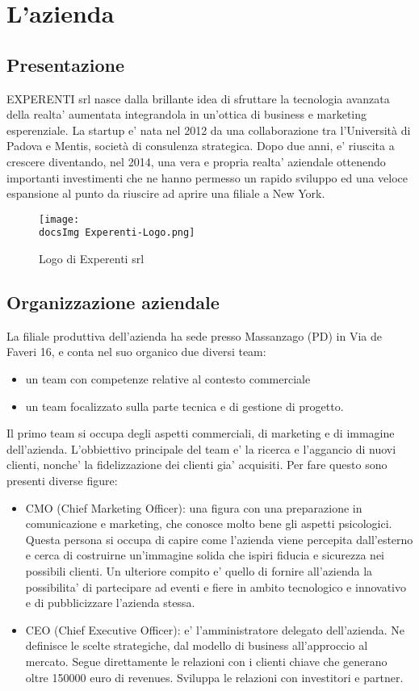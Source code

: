 \section{L'azienda}
\subsection{Presentazione}
EXPERENTI srl nasce dalla brillante idea di sfruttare la tecnologia avanzata della realta' aumentata integrandola in un'ottica di business e marketing esperenziale.
La startup e' nata nel 2012 da una collaborazione tra l’Università di Padova e Mentis, società di consulenza strategica. Dopo due anni, e' riuscita a crescere diventando, nel 2014, una vera e propria realta' aziendale ottenendo importanti investimenti che ne hanno permesso un rapido sviluppo ed una veloce espansione al punto da riuscire ad aprire una filiale a New York.

\begin{figure}[H]
	\centering
	\texttt{[image: \\docsImg Experenti-Logo.png]}
	\caption{Logo di Experenti srl}
	\label{fig:Logo di Experenti srl}
\end{figure}

\subsection{Organizzazione aziendale}
La filiale produttiva dell’azienda ha sede presso Massanzago (PD) in Via de Faveri 16, e conta nel suo organico due diversi team: 
\begin{itemize}
\item un team con competenze relative al contesto commerciale
\item un team focalizzato sulla parte tecnica e di gestione di progetto.
\end{itemize}

Il primo team si occupa degli aspetti commerciali, di marketing e di immagine dell'azienda. L'obbiettivo principale del team e' la ricerca e l'aggancio di nuovi clienti, nonche' la fidelizzazione dei clienti gia' acquisiti. Per fare questo sono presenti diverse figure:
\begin{itemize}
	\item CMO (Chief Marketing Officer): una figura con una preparazione in comunicazione e marketing, che conosce molto bene gli aspetti psicologici. Questa persona si occupa di capire come l'azienda viene percepita dall'esterno e cerca di costruirne un'immagine solida che ispiri fiducia e sicurezza nei possibili clienti. Un ulteriore compito e' quello di fornire all'azienda la possibilita' di partecipare ad eventi e fiere in ambito tecnologico e innovativo e di pubblicizzare l'azienda stessa.
	\item CEO (Chief Executive Officer): e' l'amministratore delegato dell'azienda. Ne definisce le scelte strategiche, dal modello di business all'approccio al mercato. Segue direttamente le relazioni con i clienti chiave che generano oltre 150000 euro di revenues. Sviluppa le relazioni con investitori e partner.
\end{itemize}

